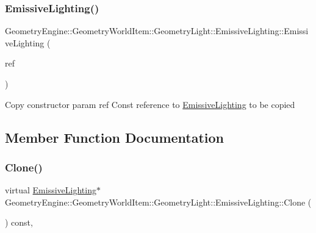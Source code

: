 \subsubsection{\texorpdfstring{EmissiveLighting()}{EmissiveLighting()}\hspace{0.1cm}{\footnotesize\ttfamily [2/2]}}
{\footnotesize\ttfamily Geometry\+Engine\+::\+Geometry\+World\+Item\+::\+Geometry\+Light\+::\+Emissive\+Lighting\+::\+Emissive\+Lighting (\begin{DoxyParamCaption}\item[{const \mbox{\hyperlink{class_geometry_engine_1_1_geometry_world_item_1_1_geometry_light_1_1_emissive_lighting}{Emissive\+Lighting}} \&}]{ref }\end{DoxyParamCaption})\hspace{0.3cm}{\ttfamily [inline]}}

Copy constructor param ref Const reference to \mbox{\hyperlink{class_geometry_engine_1_1_geometry_world_item_1_1_geometry_light_1_1_emissive_lighting}{Emissive\+Lighting}} to be copied 

\subsection{Member Function Documentation}
\mbox{\label{class_geometry_engine_1_1_geometry_world_item_1_1_geometry_light_1_1_emissive_lighting_ac7e3e90cadf700764fccdacc94238bac}} 
\subsubsection{\texorpdfstring{Clone()}{Clone()}}
{\footnotesize\ttfamily virtual \mbox{\hyperlink{class_geometry_engine_1_1_geometry_world_item_1_1_geometry_light_1_1_emissive_lighting}{Emissive\+Lighting}}$\ast$ Geometry\+Engine\+::\+Geometry\+World\+Item\+::\+Geometry\+Light\+::\+Emissive\+Lighting\+::\+Clone (\begin{DoxyParamCaption}{ }\end{DoxyParamCaption}) const\hspace{0.3cm}{\ttfamily [inline]}, {\ttfamily [virtual]}}


